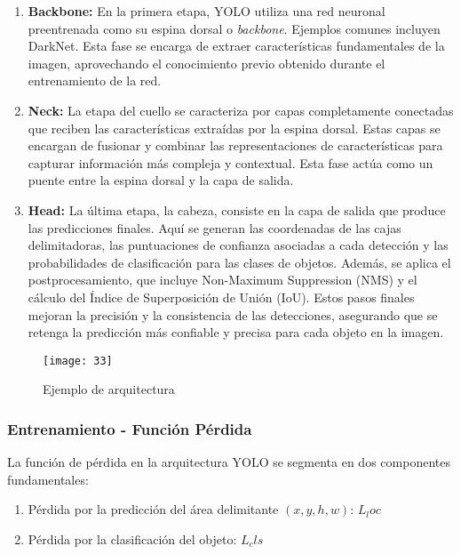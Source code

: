 	\begin{enumerate}
    	\item \textbf{Backbone:} En la primera etapa, YOLO utiliza una red neuronal preentrenada como su espina dorsal o \textit{backbone}. Ejemplos comunes incluyen DarkNet. Esta fase se encarga de extraer características fundamentales de la imagen, aprovechando el conocimiento previo obtenido durante el entrenamiento de la red.

    	\item \textbf{Neck:} La etapa del cuello se caracteriza por capas completamente conectadas que reciben las características extraídas por la espina dorsal. Estas capas se encargan de fusionar y combinar las representaciones de características para capturar información más compleja y contextual. Esta fase actúa como un puente entre la espina dorsal y la capa de salida.

    	\item \textbf{Head:} La última etapa, la cabeza, consiste en la capa de salida que produce las predicciones finales. Aquí se generan las coordenadas de las cajas delimitadoras, las puntuaciones de confianza asociadas a cada detección y las probabilidades de clasificación para las clases de objetos. Además, se aplica el postprocesamiento, que incluye Non-Maximum Suppression (NMS) y el cálculo del Índice de Superposición de Unión (IoU). Estos pasos finales mejoran la precisión y la consistencia de las detecciones, asegurando que se retenga la predicción más confiable y precisa para cada objeto en la imagen.
	\end{enumerate}

	\begin{figure}[ht]
		\centering
		\texttt{[image: 33]}
		\caption{Ejemplo de arquitectura}
	\end{figure}
	
	\subsubsection{Entrenamiento - Función Pérdida}
	La función de pérdida en la arquitectura YOLO se segmenta en dos componentes fundamentales:
	
	\begin{enumerate}
		\item Pérdida por la predicción del área delimitante $(x, y, h, w)$: $L_loc$
		\item Pérdida por la clasificación del objeto: $L_cls$
	\end{enumerate}
	
